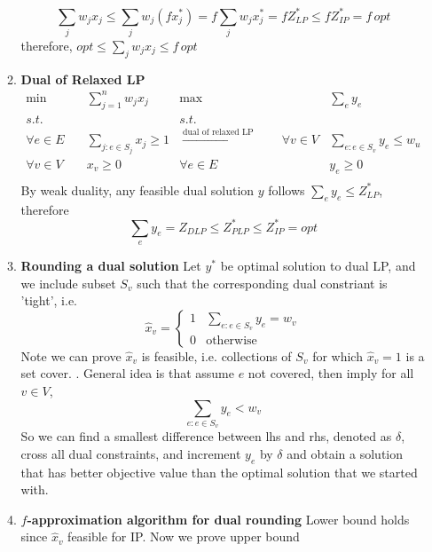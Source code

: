 \documentclass[11pt]{article}
\begin{document}
\begin{enumerate}
\begin{enumerate}
        \[
            \sum_j w_j \hat{x}_j \leq \sum_j w_j (f x_j^*) = f \sum_j w_j x_j^* = f Z_{LP}^* \leq f Z_{IP}^* = f\, opt
        \]
        therefore, $opt \leq \textstyle \sum_j w_j \hat{x}_j \leq f \, opt$ 
        \item \textbf{Dual of Relaxed LP}
        \begin{align*}
            \min \quad & \sum_{j=1}^{n} w_j x_j 
            & 
            \max \quad & \sum_{e} y_e
            \\
            s.t. \quad & 
            &
            s.t. \quad &
            \\
            \forall e\in E \quad & \sum_{j: e\in S_j} x_j \geq 1 
            &   \overset{\text{dual of relaxed LP}}{\longrightarrow} \quad \quad 
            \forall v \in V \quad & \sum_{e: e\in S_v} y_e \leq w_u 
            \\
            \forall v\in V \quad & x_v \geq 0
            & 
            \forall e\in E \quad & y_e \geq 0
            \\ 
        \end{align*}
        By weak duality, any feasible dual solution $y$ follows $\textstyle \sum_e y_e \leq Z_{LP}^*$, therefore 
        \[
            \sum_e y_e = Z_{DLP} \leq Z_{PLP}^* \leq Z_{IP}^* = opt
        \]
        \item \textbf{Rounding a dual solution} Let $y^*$ be optimal solution to dual LP, and we include subset $S_v$ such that the corresponding dual constriant is 'tight', i.e. 
        \[
            \hat{x}_v = 
            \begin{cases}
                1 & \textstyle \sum_{e:e\in S_v} y_e = w_v \\
                0 & \text{otherwise}
            \end{cases}
        \]
        Note we can prove $\hat{x}_v$ is feasible, i.e. collections of $S_v$ for which $\hat{x}_v = 1$ is a set cover. . General idea is that assume $e$ not covered, then imply for all $v\in V$, 
        \[
            \sum_{e:e\in S_v} y_e < w_v
        \]
        So we can find a smallest difference between lhs and rhs, denoted as $\delta$, cross all dual constraints, and increment $y_e$ by $\delta$ and obtain a solution that has better objective value than the optimal solution that we started with.
        \item \textbf{$f$-approximation algorithm for dual rounding} Lower bound holds since $\hat{x}_v$ feasible for IP. Now we prove upper bound 
        \[
\]
\end{enumerate}
\end{enumerate}
\end{document}
